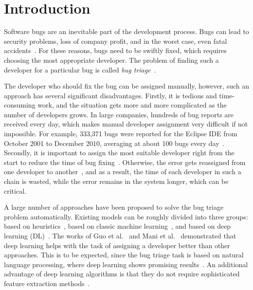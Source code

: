 \section{Introduction}\label{sec:introduction}

Software bugs are an inevitable part of the development process. Bugs can lead to security problems, loss of company profit, and in the worst case, even fatal accidents~\cite{wong2017more}. For these reasons, bugs need to be swiftly fixed, which requires choosing the most appropriate developer. The problem of finding such a developer for a particular bug is called \textit{bug triage}~\cite{Anvik2006WhoSF}.

The developer who should fix the bug can be assigned manually, however, such an approach has several significant disadvantages. Firstly, it is tedious and time-consuming work, and the situation gets more and more complicated as the number of developers grows. In large companies, hundreds of bug reports are received every day, which makes manual developer assignment very difficult if not impossible. For example, 333,371 bugs were reported for the Eclipse IDE from October 2001 to December 2010, averaging at about 100 bugs every day~\cite{Xuan2012DeveloperPI}. Secondly, it is important to assign the most suitable developer right from the start to reduce the time of bug fixing~\cite{Anvik2006WhoSF}. Otherwise, the error gets reassigned from one developer to another~\cite{Jeong2009ImprovingBT}, and as a result, the time of each developer in such a chain is wasted, while the error remains in the system longer, which can be critical. 

A large number of approaches have been proposed to solve the bug triage problem automatically. Existing models can be roughly divided into three groups: based on heuristics~\cite{Tian2016LearningTR, Tamrawi2011FuzzySA, Shokripour2015ATA, Hu2014EffectiveBT}, based on classic machine learning~\cite{Naguib2013BugRA, Xia2017ImprovingAB, sarkar2019improving}, and based on deep learning (DL)~\cite{Lee2017ApplyingDL, Guo2020DeveloperAM, Mani2019DeepTriageET, Xi2019BugTB}. The works of Guo et al.~\cite{Guo2020DeveloperAM} and Mani et al.~\cite{Mani2019DeepTriageET} demonstrated that deep learning helps with the task of assigning a developer better than other approaches.  This is to be expected, since the bug triage task is based on natural language processing, where deep learning shows promising results~\cite{Wolf2020TransformersSN}. An additional advantage of deep learning algorithms is that they do not require sophisticated feature extraction methods~\cite{Schmidhuber2015DeepLI}.

